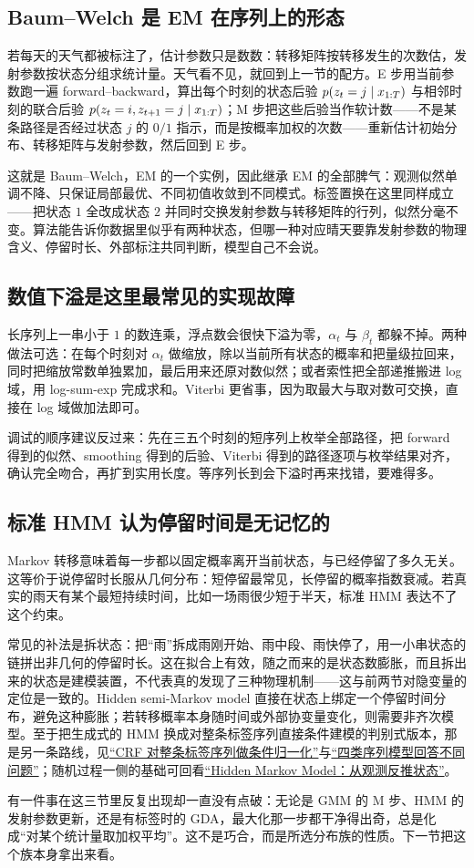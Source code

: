 \subsection{Baum--Welch 是 EM 在序列上的形态}

若每天的天气都被标注了，估计参数只是数数：转移矩阵按转移发生的次数估，发射参数按状态分组求统计量。天气看不见，就回到上一节的配方。E 步用当前参数跑一遍 forward--backward，算出每个时刻的状态后验 \(p(z_t=j\mid x_{1:T})\) 与相邻时刻的联合后验 \(p(z_t=i,z_{t+1}=j\mid x_{1:T})\)；M 步把这些后验当作软计数——不是某条路径是否经过状态 \(j\) 的 \(0/1\) 指示，而是按概率加权的次数——重新估计初始分布、转移矩阵与发射参数，然后回到 E 步。

这就是 Baum--Welch，EM 的一个实例，因此继承 EM 的全部脾气：观测似然单调不降、只保证局部最优、不同初值收敛到不同模式。标签置换在这里同样成立——把状态 \(1\) 全改成状态 \(2\) 并同时交换发射参数与转移矩阵的行列，似然分毫不变。算法能告诉你数据里似乎有两种状态，但哪一种对应晴天要靠发射参数的物理含义、停留时长、外部标注共同判断，模型自己不会说。

\subsection{数值下溢是这里最常见的实现故障}

长序列上一串小于 \(1\) 的数连乘，浮点数会很快下溢为零，\(\alpha_t\) 与 \(\beta_t\) 都躲不掉。两种做法可选：在每个时刻对 \(\alpha_t\) 做缩放，除以当前所有状态的概率和把量级拉回来，同时把缩放常数单独累加，最后用来还原对数似然；或者索性把全部递推搬进 log 域，用 log-sum-exp 完成求和。Viterbi 更省事，因为取最大与取对数可交换，直接在 log 域做加法即可。

调试的顺序建议反过来：先在三五个时刻的短序列上枚举全部路径，把 forward 得到的似然、smoothing 得到的后验、Viterbi 得到的路径逐项与枚举结果对齐，确认完全吻合，再扩到实用长度。等序列长到会下溢时再来找错，要难得多。

\subsection{标准 HMM 认为停留时间是无记忆的}

Markov 转移意味着每一步都以固定概率离开当前状态，与已经停留了多久无关。这等价于说停留时长服从几何分布：短停留最常见，长停留的概率指数衰减。若真实的雨天有某个最短持续时间，比如一场雨很少短于半天，标准 HMM 表达不了这个约束。

常见的补法是拆状态：把``雨''拆成雨刚开始、雨中段、雨快停了，用一小串状态的链拼出非几何的停留时长。这在拟合上有效，随之而来的是状态数膨胀，而且拆出来的状态是建模装置，不代表真的发现了三种物理机制——这与前两节对隐变量的定位是一致的。Hidden semi-Markov model 直接在状态上绑定一个停留时间分布，避免这种膨胀；若转移概率本身随时间或外部协变量变化，则需要非齐次模型。至于把生成式的 HMM 换成对整条标签序列直接条件建模的判别式版本，那是另一条路线，见\hyperref[sec:13-Machine-Learning/07-Graphical-and-Sequential-Models/04]{``CRF 对整条标签序列做条件归一化''}与\hyperref[sec:13-Machine-Learning/07-Graphical-and-Sequential-Models/05]{``四类序列模型回答不同问题''}；随机过程一侧的基础可回看\hyperref[sec:06-Random-Processes/04-Applications/04]{``Hidden Markov Model：从观测反推状态''}。

有一件事在这三节里反复出现却一直没有点破：无论是 GMM 的 M 步、HMM 的发射参数更新，还是有标签时的 GDA，最大化那一步都干净得出奇，总是化成``对某个统计量取加权平均''。这不是巧合，而是所选分布族的性质。下一节把这个族本身拿出来看。
